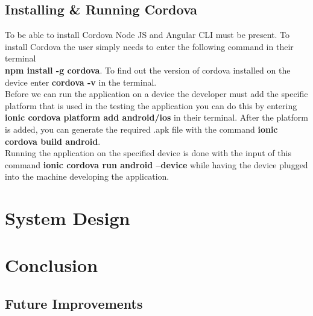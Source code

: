 \documentclass[a4paper,12pt,twoside]{report}
\begin{document}
\section{Installing \& Running Cordova }
To be able to install Cordova Node JS and Angular CLI must be present. To install Cordova the user simply needs to enter the following command in their terminal\\ \textbf{npm install -g cordova}. To find out the version of cordova installed on the device enter \textbf{cordova -v} in the terminal.\cite{cordova}\\

Before we can run the application on a device the developer must add the specific platform that is used in the testing the application you can do this by entering\\ \textbf{ionic cordova platform add android/ios} in their terminal.
After the platform is added, you can generate the required .apk file with the command  \textbf{ionic cordova build android}.\\

Running the application on the specified device is done with the input of this command \textbf{ionic cordova run android --device} while having the device plugged into the machine developing the application. \cite{cordovaRun}
\chapter{System Design}

\chapter{Conclusion}
\section{Future Improvements}


\end{document}
